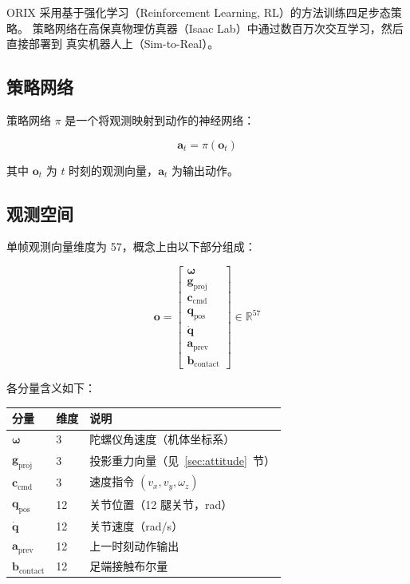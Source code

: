\documentclass[a4paper,11pt,openany]{book}
\begin{document}
ORIX 采用基于强化学习（Reinforcement Learning, RL）的方法训练四足步态策略。
策略网络在高保真物理仿真器（Isaac Lab）中通过数百万次交互学习，然后直接部署到
真实机器人上（Sim-to-Real）。

\subsection{策略网络}

策略网络 $\pi$ 是一个将观测映射到动作的神经网络：

\begin{equation}
\mathbf{a}_t = \pi(\mathbf{o}_t)
\end{equation}

其中 $\mathbf{o}_t$ 为 $t$ 时刻的观测向量，$\mathbf{a}_t$ 为输出动作。

\subsection{观测空间}

单帧观测向量维度为 57，概念上由以下部分组成：

\begin{equation}
\mathbf{o} = \begin{bmatrix}
  \boldsymbol{\omega} \\ \mathbf{g}_{\mathrm{proj}} \\ \mathbf{c}_{\mathrm{cmd}} \\
  \mathbf{q}_{\mathrm{pos}} \\ \dot{\mathbf{q}} \\ \mathbf{a}_{\mathrm{prev}} \\
  \mathbf{b}_{\mathrm{contact}}
\end{bmatrix}
\in \mathbb{R}^{57}
\end{equation}

各分量含义如下：

\begin{longtable}{llp{7.5cm}}
\toprule
分量 & 维度 & 说明 \\
\midrule
$\boldsymbol{\omega}$ & 3 & 陀螺仪角速度（机体坐标系） \\
$\mathbf{g}_{\mathrm{proj}}$ & 3 & 投影重力向量（见~\ref{sec:attitude}~节） \\
$\mathbf{c}_{\mathrm{cmd}}$ & 3 & 速度指令 $(v_x, v_y, \omega_z)$ \\
$\mathbf{q}_{\mathrm{pos}}$ & 12 & 关节位置（12 腿关节，rad） \\
$\dot{\mathbf{q}}$ & 12 & 关节速度（rad/s） \\
$\mathbf{a}_{\mathrm{prev}}$ & 12 & 上一时刻动作输出 \\
$\mathbf{b}_{\mathrm{contact}}$ & 12 & 足端接触布尔量 \\
\bottomrule
\end{longtable}
\end{document}
